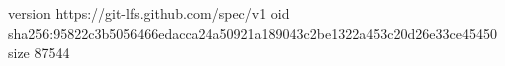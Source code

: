 version https://git-lfs.github.com/spec/v1
oid sha256:95822c3b5056466edacca24a50921a189043c2be1322a453c20d26e33ce45450
size 87544
